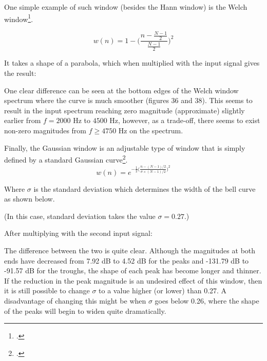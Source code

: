 One simple example of such window (besides the Hann window) is the Welch window\footcite{window_welch}.

\[w(n) = 1 - \Bigg(\frac{n-\frac{N-1}{2}}{\frac{N-1}{2}}\Bigg)^2\]

\newpage
It takes a shape of a parabola, which when multiplied with the input signal gives the result:

One clear difference can be seen at the bottom edges of the Welch window spectrum where the curve is much smoother (figures 36 and 38). This seems to result in the input spectrum reaching zero magnitude (approximate) slightly earlier from $f = 2000$ Hz to $4500$ Hz, however, as a trade-off, there seems to exist non-zero magnitudes from $f\geq 4750$ Hz on the spectrum.

\newpage
Finally, the Gaussian window is an adjustable type of window that is simply defined by a standard Gaussian curve\footcite{SASPWEB2011}.
\[w(n) = e^{-\frac{1}{2}\big(\frac{n-(N-1)/2}{\sigma\times (N-1)/2}\big)^2}\]

Where $\sigma$ is the standard deviation which determines the width of the bell curve as shown below. 

(In this case, standard deviation takes the value $\sigma = 0.27$.)

\newpage
After multiplying with the second input signal:

The difference between the two is quite clear. Although the magnitudes at both ends have decreased from 7.92 dB to 4.52 dB for the peaks and -131.79 dB to -91.57 dB for the troughs, the shape of each peak has become longer and thinner.
If the reduction in the peak magnitude is an undesired effect of this window, then it is still possible to change $\sigma$ to a value higher (or lower) than 0.27. A disadvantage of changing this might be when $\sigma$ goes below 0.26, where the shape of the peaks will begin to widen quite dramatically.

